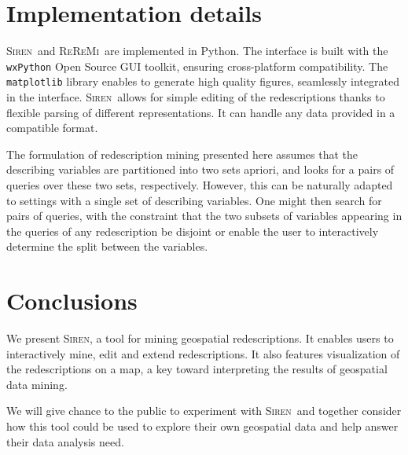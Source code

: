 \documentclass{llncs}
\newcommand{\Siren}{\textsc{Siren}}
\newcommand{\ReReMi}{\textsc{ReReMi}}
\begin{document}

\section{Implementation details}
\Siren\ and \ReReMi\ are implemented in Python.  The interface is
built with the \texttt{wxPython} Open Source GUI toolkit, ensuring
cross-platform compatibility.  The \texttt{matplotlib} library enables
to generate high quality figures, seamlessly integrated in the
interface.  \Siren\ allows for simple editing of the redescriptions
thanks to flexible parsing of different representations. It can handle
any data provided in a compatible format.

The formulation of redescription mining presented here assumes that
the describing variables are partitioned into two sets apriori, and
looks for a pairs of queries over these two sets, respectively.
However, this can be naturally adapted to settings with a single set
of describing variables.  One might then search for pairs of queries,
with the constraint that the two subsets of variables appearing in the
queries of any redescription be disjoint or enable the user to
interactively determine the split between the variables.

\section{Conclusions}
We present \Siren, a tool for mining geospatial redescriptions. It enables
users to interactively mine, edit and extend redescriptions. It also
features visualization of the redescriptions on a map, a key toward
interpreting the results of geospatial data mining.

We will give chance to the public to experiment with \Siren\ and
together consider how this tool could be used to explore their own geospatial
data and help answer their data analysis need.


  
\end{document}
